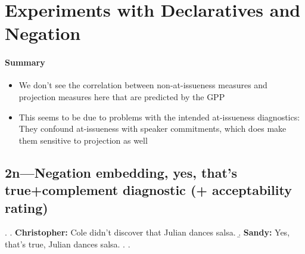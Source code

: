 \documentclass[11pt]{article}
\begin{document}
\tableofcontents



\pagebreak
\section{Experiments with Declaratives and Negation}

	\paragraph{Summary} %

		\begin{itemize}
			\item We don't see the correlation between non-at-issueness measures and projection measures here that are predicted by the GPP
			\item This seems to be due to problems with the intended at-issueness diagnostics: They confound at-issueness with speaker commitments, which does make them sensitive to projection as well
		\end{itemize}


	\subsection{2n---Negation embedding, yes, that's true+complement diagnostic (+ acceptability rating)}
			\ex. \a. \textbf{Christopher:} Cole didn’t discover that Julian dances salsa.
				\b. \textbf{Sandy:} Yes, that’s true, Julian dances salsa.
				\z.
			\z.
\end{document}
